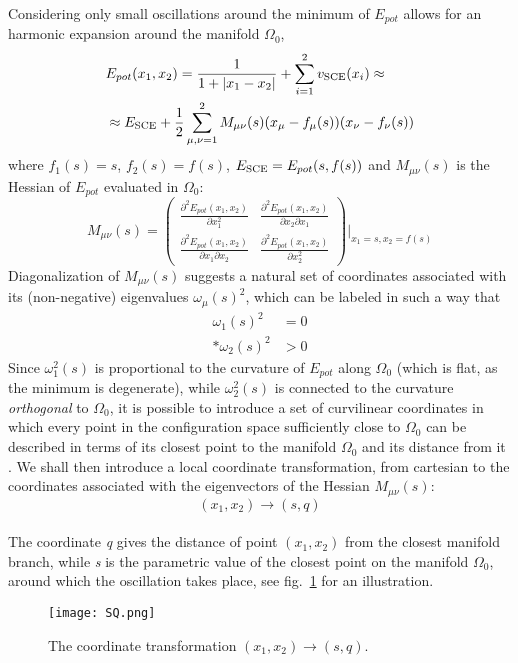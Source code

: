 \documentclass[aps,pra,twocolumn,superscriptaddress]{revtex4}
\begin{document}
Considering only small oscillations around the minimum of $E_{pot}$ allows for an harmonic expansion around the manifold $\Omega_0$,
\begin{equation}
\begin{aligned}\label{taylorEpot}
& E_{pot}(x_1,x_2) =\frac{1}{1+\vert x_1-x_2\vert}+\sum_{i=1}^2v_{\rm{SCE}}(x_i) \approx \\
&\approx E_{\rm{\rm{SCE}}}+\frac{1}{2}\sum_{\mu,\nu=1}^{2}M_{\mu\nu}(s)(x_{\mu}-f_{\mu}(s))(x_{\nu}-f_{\nu}(s))
\end{aligned}
\end{equation}
where $f_1(s)=s$, $f_2(s)=f(s)$,  $E_{\rm{\rm{SCE}}}=E_{pot}(s,f(s))$  and $M_{\mu\nu}(s)$ is the Hessian of $E_{pot}$ evaluated in $\Omega_0$:
\begin{equation}
M_{\mu\nu}(s)=
\begin{pmatrix}
\frac{\partial^2 E_{pot}(x_1,x_2)}{\partial x_1^2}&\frac{\partial^2 E_{pot}(x_1,x_2)}{\partial x_2\partial x_1}\\[10pt] \frac{\partial^2 E_{pot}(x_1,x_2)}{\partial x_1\partial x_2}&\frac{\partial^2 E_{pot}(x_1,x_2)}{\partial x_2^2}
\end{pmatrix}
\vert_{x_1=s,x_2=f(s)}
\end{equation}
Diagonalization of  $M_{\mu\nu}(s)$ suggests a natural set of coordinates associated with its (non-negative) eigenvalues $\omega_{\mu}(s)^2$, which can be labeled in such a way that \begin{align}
\omega_{1}(s)^2&=0\\* \omega_{2}(s)^2&>0
\end{align}
Since $\omega_1^2(s)$ is proportional to the curvature of $E_{pot}$ along $\Omega_0$ (which is flat, as the minimum is degenerate), while $\omega_2^2(s)$ is connected to the curvature \textit{orthogonal} to $\Omega_0$, it is possible  to introduce a set of curvilinear coordinates in which every point in the configuration space sufficiently close to  $\Omega_0$ can be described in terms of its closest point to the manifold $\Omega_0$ and its distance from it \citep{GorVigSei-JCTC-09}.
We shall then introduce a local coordinate transformation, from cartesian to the coordinates associated with the eigenvectors of the Hessian $M_{\mu\nu}(s)$:
\begin{equation}
(x_1,x_2)\rightarrow(s,q)
\end{equation}\\The coordinate \textit{q} gives the distance of point $(x_1,x_2)$ from the closest manifold branch, while \textit{s} is the parametric value of the closest point on the manifold $\Omega_0$, around which the oscillation takes place, see fig.~\ref{coordinates} for an illustration.
\begin{figure}
\centering 
\texttt{[image: SQ.png]}
\caption{\label{coordinates} The coordinate transformation $(x_1,x_2)\rightarrow(s,q)$.}
\end{figure}
\end{document}
